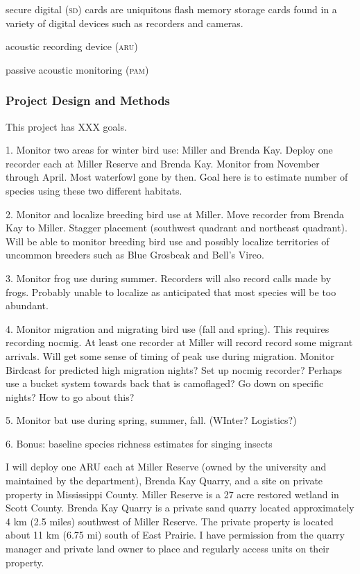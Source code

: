\documentclass[12pt]{article}
\begin{document}
secure digital (\textsc{sd}) cards are uniquitous flash memory storage cards found in a variety of digital devices such as recorders and cameras. 

acoustic recording device (\textsc{aru})

passive acoustic monitoring (\textsc{pam})


\subsubsection*{Project Design and Methods}

This project has XXX goals.

1. Monitor two areas for winter bird use: Miller and Brenda Kay. Deploy one recorder each at Miller Reserve and Brenda Kay. Monitor from November through April. Most waterfowl gone by then.  Goal here is to estimate number of species using these two different habitats.

2. Monitor and localize breeding bird use at Miller.  Move recorder from Brenda Kay to Miller. Stagger placement (southwest quadrant and northeast quadrant). Will be able to monitor breeding bird use and possibly localize territories of uncommon breeders such as Blue Grosbeak and Bell's Vireo.

3. Monitor frog use during summer. Recorders will also record calls made by frogs. Probably unable to localize as anticipated that most species will be too abundant. 

4. Monitor migration and migrating bird use (fall and spring). This requires recording nocmig. At least one recorder at Miller will record record some migrant arrivals. Will get some sense of timing of peak use during migration. Monitor Birdcast for predicted high migration nights? Set up nocmig recorder? Perhaps use a bucket system towards back that is camoflaged? Go down on specific nights? How to go about this?

5. Monitor bat use during spring, summer, fall. (WInter? Logistics?)

6. Bonus: baseline species richness estimates for singing insects


I will deploy one ARU each at Miller Reserve (owned by the university and maintained by the department), Brenda Kay Quarry, and a site on private property in Mississippi County.  Miller Reserve is a 27 acre restored wetland in Scott County.  Brenda Kay Quarry is a private sand quarry located approximately 4 km (2.5 miles) southwest of Miller Reserve. The private property is located about 11 km (6.75 mi) south of East Prairie. I have permission from the quarry manager and private land owner to place and regularly access units on their property. 
\end{document}
